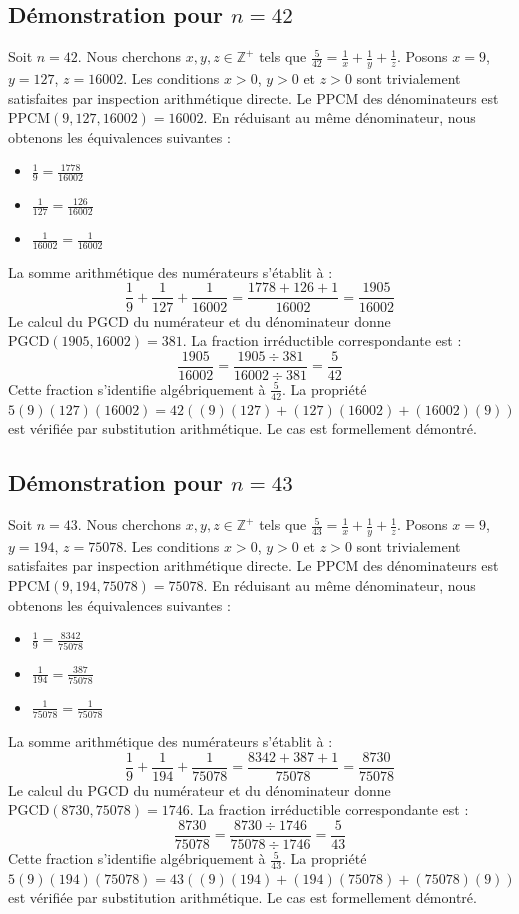 \documentclass[12pt,a4paper]{article}
\begin{document}
\subsection{Démonstration pour $n = 42$}
Soit $n = 42$. Nous cherchons $x, y, z \in \mathbb{Z}^{+}$ tels que $\frac{5}{42} = \frac{1}{x} + \frac{1}{y} + \frac{1}{z}$.
Posons $x = 9$, $y = 127$, $z = 16002$.
Les conditions $x > 0$, $y > 0$ et $z > 0$ sont trivialement satisfaites par inspection arithmétique directe.
Le PPCM des dénominateurs est $\text{PPCM}(9, 127, 16002) = 16002$.
En réduisant au même dénominateur, nous obtenons les équivalences suivantes :
\begin{itemize}
    \item $\frac{1}{9} = \frac{1778}{16002}$
    \item $\frac{1}{127} = \frac{126}{16002}$
    \item $\frac{1}{16002} = \frac{1}{16002}$
\end{itemize}
La somme arithmétique des numérateurs s'établit à :
$$ \frac{1}{9} + \frac{1}{127} + \frac{1}{16002} = \frac{1778 + 126 + 1}{16002} = \frac{1905}{16002} $$
Le calcul du PGCD du numérateur et du dénominateur donne $\text{PGCD}(1905, 16002) = 381$.
La fraction irréductible correspondante est :
$$ \frac{1905}{16002} = \frac{1905 \div 381}{16002 \div 381} = \frac{5}{42} $$
Cette fraction s'identifie algébriquement à $\frac{5}{42}$.
La propriété $5(9)(127)(16002) = 42((9)(127) + (127)(16002) + (16002)(9))$ est vérifiée par substitution arithmétique.
Le cas est formellement démontré.

\subsection{Démonstration pour $n = 43$}
Soit $n = 43$. Nous cherchons $x, y, z \in \mathbb{Z}^{+}$ tels que $\frac{5}{43} = \frac{1}{x} + \frac{1}{y} + \frac{1}{z}$.
Posons $x = 9$, $y = 194$, $z = 75078$.
Les conditions $x > 0$, $y > 0$ et $z > 0$ sont trivialement satisfaites par inspection arithmétique directe.
Le PPCM des dénominateurs est $\text{PPCM}(9, 194, 75078) = 75078$.
En réduisant au même dénominateur, nous obtenons les équivalences suivantes :
\begin{itemize}
    \item $\frac{1}{9} = \frac{8342}{75078}$
    \item $\frac{1}{194} = \frac{387}{75078}$
    \item $\frac{1}{75078} = \frac{1}{75078}$
\end{itemize}
La somme arithmétique des numérateurs s'établit à :
$$ \frac{1}{9} + \frac{1}{194} + \frac{1}{75078} = \frac{8342 + 387 + 1}{75078} = \frac{8730}{75078} $$
Le calcul du PGCD du numérateur et du dénominateur donne $\text{PGCD}(8730, 75078) = 1746$.
La fraction irréductible correspondante est :
$$ \frac{8730}{75078} = \frac{8730 \div 1746}{75078 \div 1746} = \frac{5}{43} $$
Cette fraction s'identifie algébriquement à $\frac{5}{43}$.
La propriété $5(9)(194)(75078) = 43((9)(194) + (194)(75078) + (75078)(9))$ est vérifiée par substitution arithmétique.
Le cas est formellement démontré.
\end{document}
